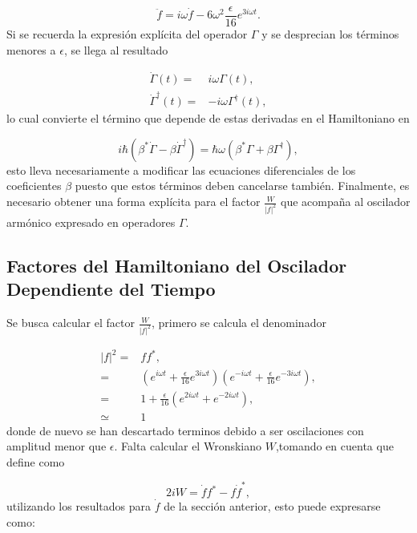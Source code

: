 \documentclass[a4paper,10pt]{report}
\begin{document}
\begin{equation}
\ddot{f} = i\omega\dot{f} - 6\omega^2\frac{\epsilon}{16} e^{3i\omega t}.
\end{equation}Si se recuerda la expresión explícita del operador $\Gamma$ y se desprecian los términos menores a $\epsilon$, se llega al resultado

\begin{align}
\dot{\Gamma}(t) =& i\omega \Gamma(t),\\
\dot{\Gamma}^\dagger(t) =& -i\omega \Gamma^\dagger(t),
\end{align} lo cual convierte el término que depende de estas derivadas en el Hamiltoniano en

\begin{equation}
i\hbar(\beta^*\dot{\Gamma}-\beta\dot{\Gamma}^\dagger) = \hbar\omega(\beta^*\Gamma+\beta\Gamma^{\dagger}),
\end{equation} esto lleva necesariamente a modificar las ecuaciones diferenciales de los coeficientes $\beta$ puesto que estos términos deben cancelarse también. Finalmente, es necesario obtener una forma explícita para el factor $\frac{W}{|f|^2}$ que acompaña al oscilador armónico expresado en operadores $\Gamma$.

\subsection{Factores del Hamiltoniano del Oscilador Dependiente del Tiempo}

Se busca calcular el factor $\frac{W}{|f|^2}$, primero se calcula el denominador

\begin{align*}
|f|^2=&ff^*,\\
=& (e^{i\omega t} + \frac{\epsilon}{16} e^{3i\omega t})(e^{-i\omega t} + \frac{\epsilon}{16} e^{-3i\omega t}),\\
=& 1+\frac{\epsilon}{16}(e^{2i\omega t}+e^{-2i\omega t}),\\
\simeq & 1
\end{align*} donde de nuevo se han descartado terminos debido a ser oscilaciones con amplitud menor que $\epsilon$. Falta calcular el Wronskiano $W$,tomando en cuenta que \cite{BrownPT} define como

\begin{equation}
2iW = \dot{f}f^* - f\dot{f}^*,
\end{equation} utilizando los resultados para $\dot{f}$ de la sección anterior, esto puede expresarse como:
\end{document}
